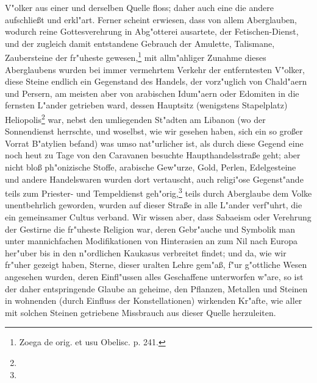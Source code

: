 \documentclass[a4paper, 11pt, oneside, polutonikogreek, german]{article}
\begin{document}
V"olker aus einer und derselben Quelle floss; daher auch eine die andere aufschließt und erkl"art. Ferner scheint erwiesen, dass von allem Aberglauben, wodurch reine Gottesverehrung in Abg"otterei ausartete, der Fetischen-Dienst, und der zugleich damit entstandene Gebrauch der Amulette, Talismane, Zaubersteine der fr"uheste gewesen,\footnote{Zoega de orig. et usu Obelisc. p. 241.} mit allm"ahliger Zunahme dieses Aberglaubens wurden bei immer vermehrtem Verkehr der entferntesten V"olker, diese Steine endlich ein Gegenstand des Handels, der vorz"uglich von Chald"aern und Persern, am meisten aber von arabischen Idum"aern oder Edomiten in die fernsten L"ander getrieben ward, dessen Hauptsitz (wenigstens Stapelplatz) Heliopolis\footnote{} war, nebst den umliegenden St"adten am Libanon (wo der Sonnendienst herrschte, und woselbst, wie wir gesehen haben, sich ein so großer Vorrat B"atylien befand) was umso nat"urlicher ist, als durch diese Gegend eine noch heut zu Tage von den Caravanen besuchte Haupthandelsstraße geht; aber nicht bloß ph"onizische Stoffe, arabische Gew"urze, Gold, Perlen, Edelgesteine und andere Handelswaren wurden dort vertauscht, auch religi"ose Gegenst"ande teils zum Priester- und Tempeldienst geh"orig,\footnote{} teils durch Aberglaube dem Volke unentbehrlich geworden, wurden auf dieser Straße in alle L"ander verf"uhrt, die ein gemeinsamer Cultus verband. Wir wissen aber, dass Sabaeism oder Verehrung der Gestirne die fr"uheste Religion war, deren Gebr"auche und Symbolik man unter mannichfachen Modifikationen von Hinterasien an zum Nil nach Europa her"uber bis in den n"ordlichen Kaukasus verbreitet findet; und da, wie wir fr"uher gezeigt haben, Sterne, dieser uralten Lehre gem"aß, f"ur g"ottliche Wesen angesehen wurden, deren Einfl"ussen alles Geschaffene unterworfen w"are, so ist der daher entspringende Glaube an geheime, den Pflanzen, Metallen und Steinen in wohnenden (durch Einfluss der Konstellationen) wirkenden Kr"afte, wie aller mit solchen Steinen getriebene Missbrauch aus dieser Quelle herzuleiten.
\end{document}
